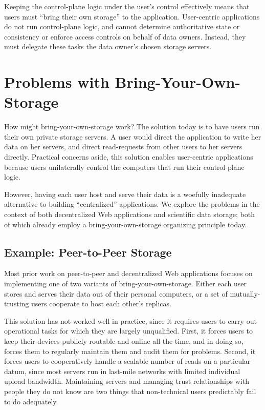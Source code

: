 Keeping the control-plane logic under the user's control effectively means that
users must ``bring their own storage'' to the application.  User-centric applications
do not run control-plane logic, and cannot determine authoritative state or consistency
or enforce access controls on
behalf of data owners. Instead, they must
delegate these tasks the data owner's chosen storage servers.

\section{Problems with Bring-Your-Own-Storage}

How might bring-your-own-storage work?  The solution today is to have
users run their own private storage servers.  A user would direct
the application to write her data on her servers, and direct
read-requests from other users to her servers directly.
Practical concerns aside, this solution
enables user-centric applications because users unilaterally
control the computers that run their control-plane logic.

However, having each user host and serve their data is a woefully inadequate
alternative to building ``centralized'' applications.  We explore the problems
in the context of both decentralized Web applications and scientific data
storage; both of which already employ a bring-your-own-storage organizing
principle today.

\subsection{Example: Peer-to-Peer Storage}

Most prior work on peer-to-peer and decentralized Web applications
focuses on implementing one of two variants of bring-your-own-storage.
Either each user stores and serves their
data out of their personal computers, or a set of mutually-trusting
users cooperate to host each other's replicas.

This solution has not worked well in practice, since it requires users to carry
out operational tasks for which they are largely unqualified.
First, it forces users to keep their devices publicly-routable and online all
the time, and in doing so, forces them to regularly maintain them and audit them
for problems.  Second, it forces users to cooperatively handle
a scalable number of reads on a particular datum, since most servers run
in last-mile networks with limited individual upload bandwidth.
Maintaining servers and managing trust relationships
with people they do not know are two things that non-technical users
predictably fail to do adequately.

